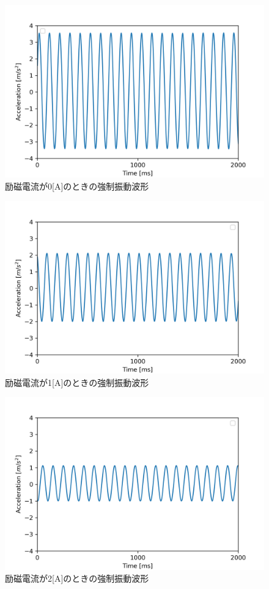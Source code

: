 \documentclass[a4paper,10.5pt]{jsarticle}
\begin{document}
\begin{figure}[h]
  \centering
  \includegraphics[width=14cm]{vib1.png}
  \caption{励磁電流が0[A]のときの強制振動波形}
\end{figure}
\begin{figure}[h]
  \centering
  \includegraphics[width=14cm]{vib2.png}
  \caption{励磁電流が1[A]のときの強制振動波形}
\end{figure}
\newpage
\begin{figure}[h]
  \centering
  \includegraphics[width=14cm]{vib3.png}
  \caption{励磁電流が2[A]のときの強制振動波形}
\end{figure}
\end{document}
